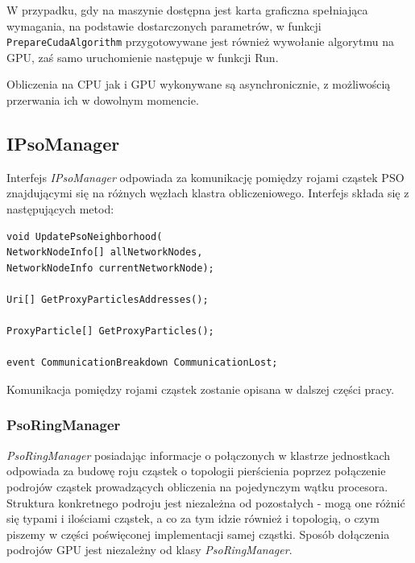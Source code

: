 \documentclass[12pt, twoside, openany, abstract=on]{report}
\theoremstyle{definition}
\begin{document}
W przypadku, gdy na maszynie dostępna jest karta graficzna spełniająca wymagania, na podstawie dostarczonych parametrów, w funkcji \texttt{PrepareCudaAlgorithm} przygotowywane jest również wywołanie algorytmu na GPU, zaś samo uruchomienie następuje w funkcji Run.

Obliczenia na CPU jak i GPU wykonywane są asynchronicznie, z możliwością przerwania ich w dowolnym momencie.


\subsection{IPsoManager}

Interfejs \textit{IPsoManager} odpowiada za komunikację pomiędzy rojami cząstek PSO znajdującymi się na różnych węzłach klastra obliczeniowego. Interfejs składa się z następujących metod:

\lstset{style=sharpc}
\begin{lstlisting}[frame=single]
void UpdatePsoNeighborhood(
NetworkNodeInfo[] allNetworkNodes, 
NetworkNodeInfo currentNetworkNode);
  
Uri[] GetProxyParticlesAddresses();

ProxyParticle[] GetProxyParticles();

event CommunicationBreakdown CommunicationLost;
\end{lstlisting}

Komunikacja pomiędzy rojami cząstek zostanie opisana w dalszej części pracy.

\subsubsection{PsoRingManager}
\textit{PsoRingManager} posiadając informacje o połączonych w klastrze jednostkach odpowiada za budowę roju cząstek o topologii pierścienia poprzez połączenie podrojów cząstek prowadzących obliczenia na pojedynczym wątku procesora. Struktura konkretnego podroju jest niezależna od pozostałych - mogą one różnić się typami i ilościami cząstek, a co za tym idzie również i topologią, o czym piszemy w części poświęconej implementacji samej cząstki. Sposób dołączenia podrojów GPU jest niezależny od klasy \textit{PsoRingManager}. 
\end{document}

